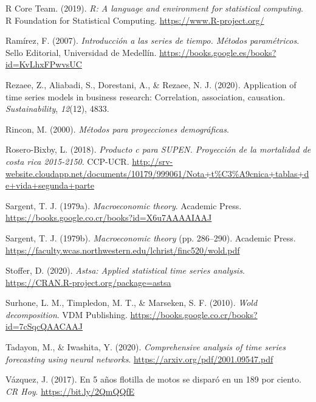 \documentclass[
]{article}
\newlength{\cslhangindent}
\newlength{\cslentryspacingunit} %
\newenvironment{CSLReferences}[2] %
 {%
  \setlength{\parindent}{0pt}
  \ifodd #1
  \let\oldpar\par
  \def\par{\hangindent=\cslhangindent\oldpar}
  \fi
  \setlength{\parskip}{#2\cslentryspacingunit}
 }%
 {}
\begin{document}
\begin{CSLReferences}{1}{0}
\leavevmode{}%
R Core Team. (2019). \emph{R: A language and environment for statistical
computing}. R Foundation for Statistical Computing.
\url{https://www.R-project.org/}

\leavevmode{}%
Ramírez, F. (2007). \emph{Introducción a las series de tiempo. Métodos
paramétricos}. Sello Editorial, Universidad de Medellín.
\url{https://books.google.es/books?id=KvLhxFPwvsUC}

\leavevmode{}%
Rezaee, Z., Aliabadi, S., Dorestani, A., \& Rezaee, N. J. (2020).
Application of time series models in business research: Correlation,
association, causation. \emph{Sustainability}, \emph{12}(12), 4833.

\leavevmode{}%
Rincon, M. (2000). \emph{Métodos para proyecciones demográficas}.

\leavevmode{}%
Rosero-Bixby, L. (2018). \emph{Producto c para SUPEN. Proyección de la
mortalidad de costa rica 2015-2150}. CCP-UCR.
\url{http://srv-website.cloudapp.net/documents/10179/999061/Nota+t\%C3\%A9cnica+tablas+de+vida+segunda+parte}

\leavevmode{}%
Sargent, T. J. (1979a). \emph{Macroeconomic theory}. Academic Press.
\url{https://books.google.co.cr/books?id=X6u7AAAAIAAJ}

\leavevmode{}%
Sargent, T. J. (1979b). \emph{Macroeconomic theory} (pp. 286--290).
Academic Press.
\url{https://faculty.wcas.northwestern.edu/lchrist/finc520/wold.pdf}

\leavevmode{}%
Stoffer, D. (2020). \emph{Astsa: Applied statistical time series
analysis}. \url{https://CRAN.R-project.org/package=astsa}

\leavevmode{}%
Surhone, L. M., Timpledon, M. T., \& Marseken, S. F. (2010). \emph{Wold
decomposition}. VDM Publishing.
\url{https://books.google.co.cr/books?id=7cSqcQAACAAJ}

\leavevmode{}%
Tadayon, M., \& Iwashita, Y. (2020). \emph{Comprehensive analysis of
time series forecasting using neural networks}.
\url{https://arxiv.org/pdf/2001.09547.pdf}

\leavevmode{}%
Vázquez, J. (2017). En 5 años flotilla de motos se disparó en un 189 por
ciento. \emph{CR Hoy}. \url{https://bit.ly/2QmQQfE}


\end{CSLReferences}
\end{document}
